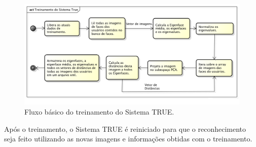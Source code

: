 		\begin{figure}[htb]
			\begin{center}
				\includegraphics[scale=0.5]{figuras/4.ProblemaEProposta/diagrama-registro.png}
			\end{center}
			\caption{Fluxo básico do treinamento do Sistema TRUE.}
			\label{fig:treinamento}
		\end{figure}	

	Após o treinamento, o Sistema TRUE é reiniciado para que o reconhecimento seja feito utilizando as novas imagens e informações obtidas com o treinamento.